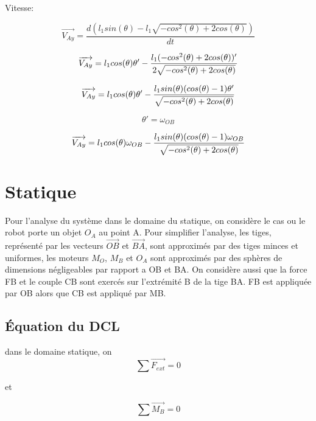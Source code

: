 \documentclass{article}
\begin{document}
\noindent Vitesse:

\begin{equation}
\overrightarrow{V_{Ay}} = \frac{d(l_1sin(\theta)-l_1\sqrt{-cos^2(\theta)+2cos(\theta)})}{dt}
\end{equation}

\begin{equation}
\overrightarrow{V_{Ay}} = l_1cos(\theta)\theta'-\\
\frac{l_1(-cos^2(\theta)+2cos(\theta))'}{2\sqrt{-cos^2(\theta)+2cos(\theta)}}
\end{equation}

\begin{equation}
\overrightarrow{V_{Ay}} = l_1cos(\theta)\theta'-\\
\frac{l_1sin(\theta)(cos(\theta)-1)\theta'}{\sqrt{-cos^2(\theta)+2cos(\theta)}}
\end{equation}

\begin{equation}
\theta' = \omega_{OB}
\end{equation}

\begin{equation}
\overrightarrow{V_{Ay}} = l_1cos(\theta)\omega_{OB}-\\
\frac{l_1sin(\theta)(cos(\theta)-1)\omega_{OB}}{\sqrt{-cos^2(\theta)+2cos(\theta)}}
\end{equation}

\section{Statique}
Pour l'analyse du système dans le domaine du statique, on considère le cas ou le robot porte un objet $O_A$ au point A. Pour simplifier l'analyse, les tiges, représenté par les vecteurs $\overrightarrow{OB}$ et $\overrightarrow{BA}$, sont approximés par des tiges minces et uniformes, les moteurs $M_O$, $M_B$ et $O_A$ sont approximés par des sphères de dimensions négligeables par rapport a OB et BA. On considère aussi que la force FB et le couple CB sont exercés sur l’extrémité B de la tige BA. FB est appliquée par OB alors que CB est appliqué par MB.
\subsection{Équation du DCL}
dans le domaine statique, on
\begin{equation}
\sum \overrightarrow{F_{ext}} = 0
\end{equation}
\begin{center} 
et 
\end{center}

\begin{equation}
\sum \overrightarrow{M_B} = 0
\end{equation}
\end{document}

